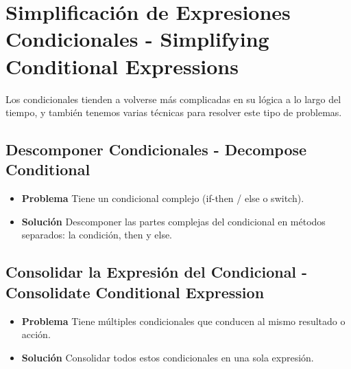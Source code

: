\documentclass[11pt,a4paper,oneside]{book}
\begin{document}


\section{Simplificación de Expresiones Condicionales - Simplifying Conditional Expressions}

\label{renombrarmetodo}Los condicionales tienden a volverse más complicadas en su lógica a lo largo del tiempo, y también tenemos varias técnicas para resolver este tipo de problemas.

\subsection{Descomponer Condicionales - Decompose Conditional}  
\begin{itemize}
    \item \textbf{Problema} Tiene un condicional complejo (if-then / else o switch).
    
    
    
    \item \textbf{Solución} Descomponer las partes complejas del condicional en métodos separados: la condición, then y else.
    
    
\end{itemize}

\subsection{Consolidar la Expresión del Condicional - Consolidate Conditional Expression}  \begin{itemize}
    \item \textbf{Problema} Tiene múltiples condicionales que conducen al mismo resultado o acción.
    
    
    
    \item \textbf{Solución} Consolidar todos estos condicionales en una sola expresión.
    
    
\end{itemize}
    
\end{document}
